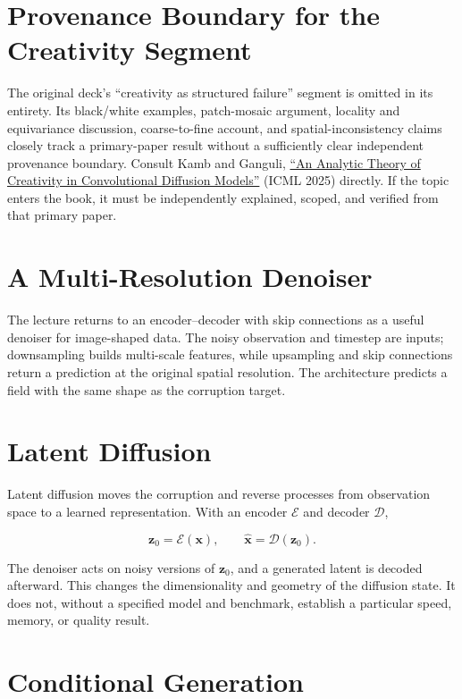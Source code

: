 \documentclass{article}
\begin{document}
\section{Provenance Boundary for the Creativity Segment}

The original deck's ``creativity as structured failure'' segment is omitted in its
entirety. Its black/white examples, patch-mosaic argument, locality and equivariance
discussion, coarse-to-fine account, and spatial-inconsistency claims closely track a
primary-paper result without a sufficiently clear independent provenance boundary.
Consult Kamb and Ganguli,
\href{https://proceedings.mlr.press/v267/kamb25a.html}
{``An Analytic Theory of Creativity in Convolutional Diffusion Models''}
(ICML 2025) directly. If the topic enters the book, it must be independently explained,
scoped, and verified from that primary paper.

\section{A Multi-Resolution Denoiser}

The lecture returns to an encoder--decoder with skip connections as a useful denoiser
for image-shaped data. The noisy observation and timestep are inputs; downsampling
builds multi-scale features, while upsampling and skip connections return a prediction
at the original spatial resolution. The architecture predicts a field with the same
shape as the corruption target.


\section{Latent Diffusion}

Latent diffusion moves the corruption and reverse processes from observation space to
a learned representation. With an encoder $\mathcal{E}$ and decoder $\mathcal{D}$,

\[
\mathbf{z}_0=\mathcal{E}(\mathbf{x}),
\qquad
\hat{\mathbf{x}}=\mathcal{D}(\mathbf{z}_0).
\]

The denoiser acts on noisy versions of $\mathbf{z}_0$, and a generated latent is
decoded afterward. This changes the dimensionality and geometry of the diffusion
state. It does not, without a specified model and benchmark, establish a particular
speed, memory, or quality result.

\section{Conditional Generation}
\end{document}
